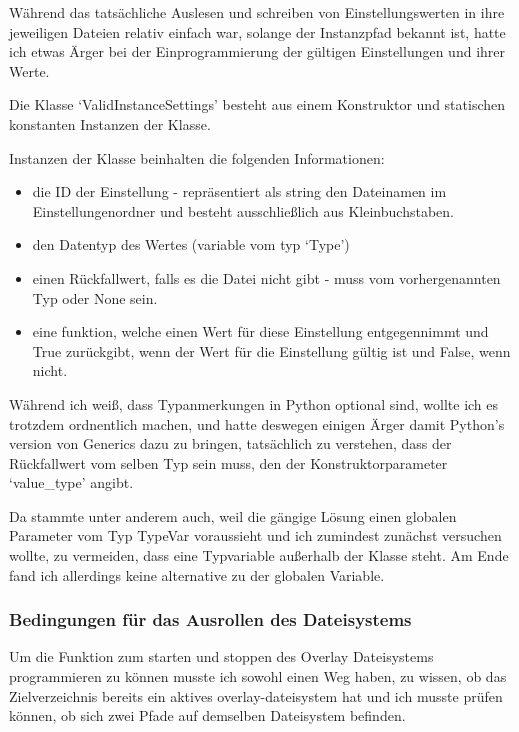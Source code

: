 \documentclass[a4paper,numbers=withenddot,11pt]{scrartcl}
\begin{document}
Während das tatsächliche Auslesen und schreiben von Einstellungswerten
in ihre jeweiligen Dateien relativ einfach war, solange der Instanzpfad
bekannt ist, hatte ich etwas Ärger bei der Einprogrammierung der
gültigen Einstellungen und ihrer Werte.

Die Klasse `ValidInstanceSettings' besteht aus einem Konstruktor
und statischen konstanten Instanzen der Klasse.

Instanzen der Klasse beinhalten die folgenden Informationen:

\begin{itemize}
  \item die ID der Einstellung - repräsentiert als string den Dateinamen im Einstellungenordner
        und besteht ausschließlich aus Kleinbuchstaben.
  \item den Datentyp des Wertes (variable vom typ `Type')
  \item einen Rückfallwert, falls es die Datei nicht gibt - muss vom vorhergenannten Typ
        oder None sein.
  \item eine funktion, welche einen Wert für diese Einstellung entgegennimmt und True zurückgibt,
        wenn der Wert für die Einstellung gültig ist und False, wenn nicht.
\end{itemize}

Während ich weiß, dass Typanmerkungen in Python optional sind,
wollte ich es trotzdem ordnentlich machen, und
hatte deswegen einigen Ärger damit Python's version von Generics
dazu zu bringen, tatsächlich zu verstehen, dass der Rückfallwert
vom selben Typ sein muss, den der Konstruktorparameter `value\_type' angibt.

Da stammte unter anderem auch, weil die gängige Lösung einen globalen Parameter
vom Typ TypeVar voraussieht und ich zumindest zunächst versuchen wollte,
zu vermeiden, dass eine Typvariable außerhalb der Klasse steht.
Am Ende fand ich allerdings keine alternative zu der globalen Variable.

\subsubsection{Bedingungen für das Ausrollen des Dateisystems}

Um die Funktion zum starten und stoppen des Overlay Dateisystems
programmieren zu können musste ich sowohl einen Weg haben, zu wissen,
ob das Zielverzeichnis bereits ein aktives overlay-dateisystem hat und
ich musste prüfen können, ob sich zwei Pfade auf demselben Dateisystem befinden.
\end{document}
